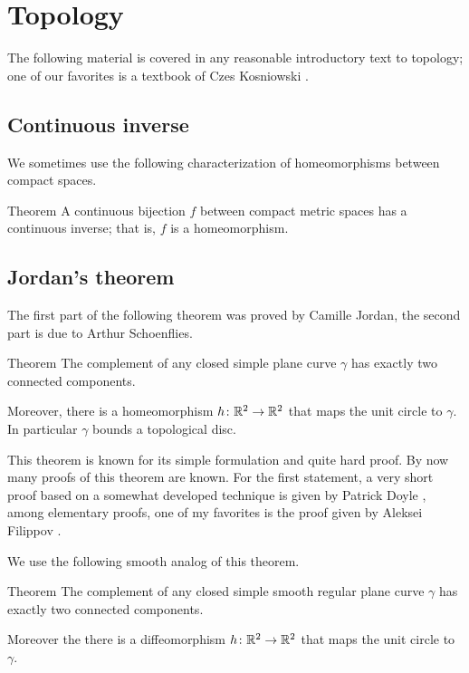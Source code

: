 \section{Topology}

The following material is covered in any reasonable introductory text to topology; 
one of our favorites is a textbook of Czes Kosniowski \cite{kosniowski}.

\subsection*{Continuous inverse}

We sometimes use the following characterization of homeomorphisms between compact spaces.

\begin{thm}{Theorem}\label{thm:Hausdorff-compact}
A continuous bijection $f$ between compact metric spaces has a continuous inverse;
that is, $f$ is a homeomorphism.
\end{thm}

\subsection*{Jordan's theorem}

The first part of the following theorem was proved by Camille Jordan, the second part is due to Arthur Schoenflies.

\begin{thm}{Theorem}\label{thm:jordan}
The complement of any closed simple plane curve $\gamma$ has exactly two connected components. 

Moreover, there is a homeomorphism $h\colon\mathbb{R}^2\to \mathbb{R}^2$ that maps the unit circle to $\gamma$.
In particular $\gamma$ bounds a topological disc.
\end{thm}

This theorem is known for its simple formulation and quite hard proof.
By now many proofs of this theorem are known.
For the first statement, a very short proof based on a somewhat developed technique is given by Patrick Doyle \cite{doyle},
among elementary proofs, one of my favorites is the proof given by Aleksei Filippov \cite{filippov}.

We use the following smooth analog of this theorem.

\begin{thm}{Theorem}
The complement of any closed simple smooth regular plane curve $\gamma$ has exactly two connected components. 

Moreover the there is a diffeomorphism $h\colon\mathbb{R}^2\to \mathbb{R}^2$ that maps the unit circle to $\gamma$.
\end{thm}


